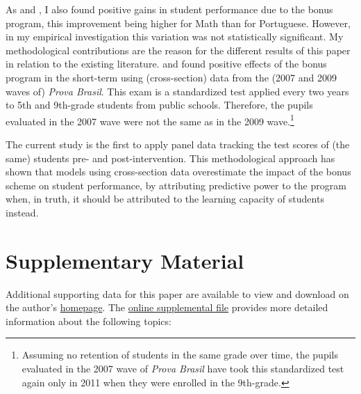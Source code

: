 \documentclass[a4paper, 12pt]{article}
\begin{document}
 

As \citet{lepine2016teacher} and \citet{oshiro2015impacto}, I also found positive gains in student performance due to the bonus program, this improvement being higher for Math than for Portuguese. However, in my empirical investigation this variation was not statistically significant. My methodological contributions are the reason for the different results of this paper in relation to the existing literature. \citet{lepine2016teacher} and \citet{oshiro2015impacto} found positive effects of the bonus program in the short-term using (cross-section) data from the (2007 and 2009 waves of) \textit{Prova Brasil}. This exam is a standardized test applied every two years to 5th and 9th-grade students from public schools. Therefore, the pupils evaluated in the 2007 wave were not the same as in the 2009 wave.\footnote{Assuming no retention of students in the same grade over time, the pupils evaluated in the 2007 wave of \textit{Prova Brasil} have took this standardized test again only in 2011 when they were enrolled in the 9th-grade.}

The current study is the first to apply panel data tracking the test scores of (the same) students pre- and post-intervention. This methodological approach has shown that models using cross-section data overestimate the impact of the bonus scheme on student performance, by attributing predictive power to the program \textemdash when, in truth, it should be attributed to the learning capacity of students instead.





\newpage
\section*{Supplementary Material} \label{SuppMaterial}


Additional supporting data for this paper are available to view and download on the author’s \href{https://tharcisio-leone.com/}{homepage}. The \href{http://tiny.cc/p8heoz}{online supplemental file} provides more detailed information about the following topics:
\end{document}
